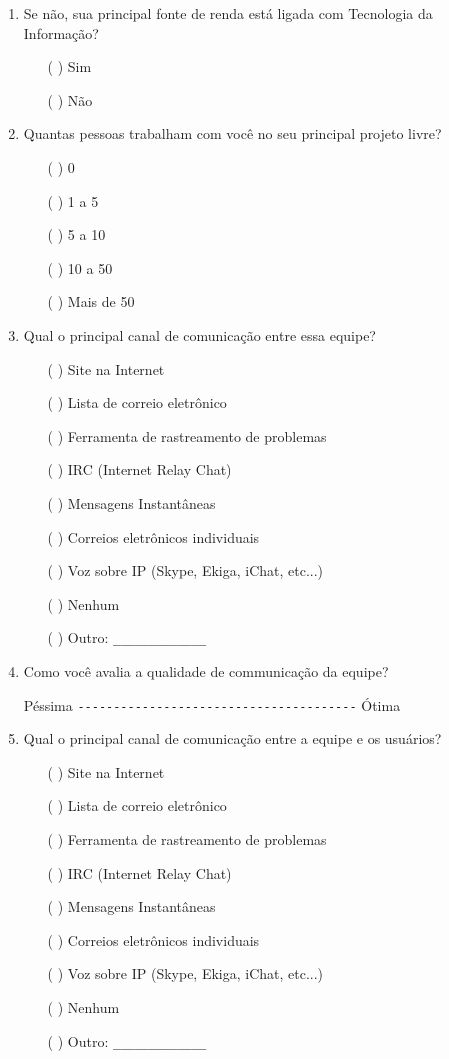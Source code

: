 \begin{enumerate}
\item Se não, sua principal fonte de renda está ligada com Tecnologia
  da Informação?
  \begin{itemize}
  \item[( )] Sim
  \item[( )] Não
  \end{itemize}

\item Quantas pessoas trabalham com você no seu principal projeto
  livre?
  \begin{itemize}
  \item[( )] 0
  \item[( )] 1 a 5
  \item[( )] 5 a 10
  \item[( )] 10 a 50
  \item[( )] Mais de 50
  \end{itemize}

\item Qual o principal canal de comunicação entre essa equipe?
  \begin{itemize}
  \item[( )] Site na Internet
  \item[( )] Lista de correio eletrônico
  \item[( )] Ferramenta de rastreamento de problemas
  \item[( )] IRC (Internet Relay Chat)
  \item[( )] Mensagens Instantâneas
  \item[( )] Correios eletrônicos individuais
  \item[( )] Voz sobre IP (Skype, Ekiga, iChat, etc...)
  \item[( )] Nenhum
  \item[( )] Outro: \verb=_____________=
  \end{itemize}

\item Como você avalia a qualidade de communicação da equipe?

  Péssima \verb=---------------------------------------= Ótima

\item Qual o principal canal de comunicação entre a equipe e os
  usuários?
  \begin{itemize}
  \item[( )] Site na Internet
  \item[( )] Lista de correio eletrônico
  \item[( )] Ferramenta de rastreamento de problemas
  \item[( )] IRC (Internet Relay Chat)
  \item[( )] Mensagens Instantâneas
  \item[( )] Correios eletrônicos individuais
  \item[( )] Voz sobre IP (Skype, Ekiga, iChat, etc...)
  \item[( )] Nenhum
  \item[( )] Outro: \verb=_____________=
  \end{itemize}


\end{enumerate}

